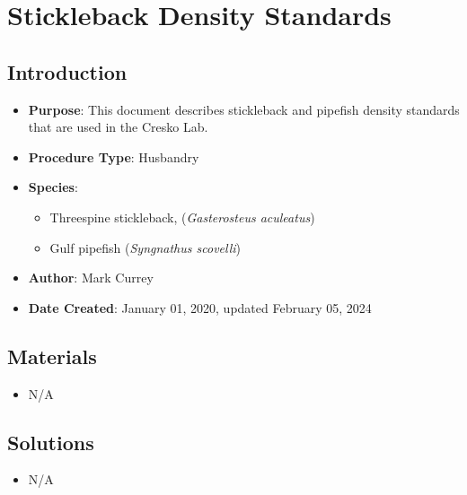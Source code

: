 \documentclass[
  letterpaper,
  DIV=11,
  numbers=noendperiod]{scrreprt}
\providecommand{\tightlist}{%
  \setlength{\itemsep}{0pt}\setlength{\parskip}{0pt}}\usepackage{longtable,booktabs,array}
\begin{document}
\hypertarget{sec-husbandry-stickle_density}{%
\chapter{Stickleback Density
Standards}\label{sec-husbandry-stickle_density}}

\hypertarget{introduction-49}{%
\section{Introduction}\label{introduction-49}}

\begin{itemize}
\tightlist
\item
  \textbf{Purpose}: This document describes stickleback and pipefish
  density standards that are used in the Cresko Lab.
\item
  \textbf{Procedure Type}: Husbandry
\item
  \textbf{Species}:

  \begin{itemize}
  \tightlist
  \item
    Threespine stickleback, (\emph{Gasterosteus aculeatus})
  \item
    Gulf pipefish (\emph{Syngnathus scovelli})
  \end{itemize}
\item
  \textbf{Author}: Mark Currey\\
\item
  \textbf{Date Created}: January 01, 2020, updated February 05, 2024
\end{itemize}

\hypertarget{materials-47}{%
\section{Materials}\label{materials-47}}

\begin{itemize}
\tightlist
\item
  N/A
\end{itemize}

\hypertarget{solutions-38}{%
\section{Solutions}\label{solutions-38}}

\begin{itemize}
\tightlist
\item
  N/A
\end{itemize}
\end{document}
